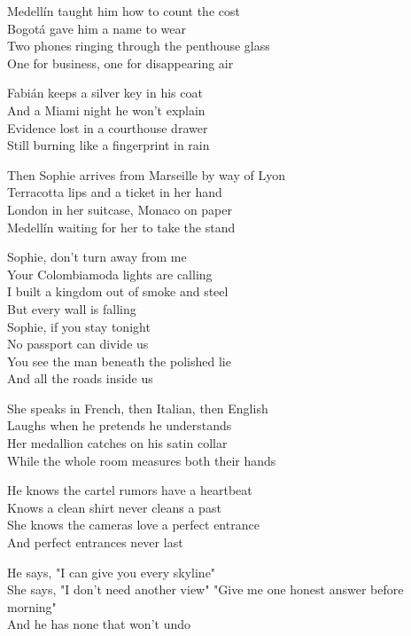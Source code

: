 \begin{lyrics}
Medellín taught him how to count the cost\\
Bogotá gave him a name to wear\\
Two phones ringing through the penthouse glass\\
One for business, one for disappearing air

Fabián keeps a silver key in his coat\\
And a Miami night he won't explain\\
Evidence lost in a courthouse drawer\\
Still burning like a fingerprint in rain

Then Sophie arrives from Marseille by way of Lyon\\
Terracotta lips and a ticket in her hand\\
London in her suitcase, Monaco on paper\\
Medellín waiting for her to take the stand

Sophie, don't turn away from me\\
Your Colombiamoda lights are calling\\
I built a kingdom out of smoke and steel\\
But every wall is falling\\
Sophie, if you stay tonight\\
No passport can divide us\\
You see the man beneath the polished lie\\
And all the roads inside us

She speaks in French, then Italian, then English\\
Laughs when he pretends he understands\\
Her medallion catches on his satin collar\\
While the whole room measures both their hands

He knows the cartel rumors have a heartbeat\\
Knows a clean shirt never cleans a past\\
She knows the cameras love a perfect entrance\\
And perfect entrances never last

He says, "I can give you every skyline"\\
She says, "I don't need another view"
"Give me one honest answer before morning"\\
And he has none that won't undo


\end{lyrics}
